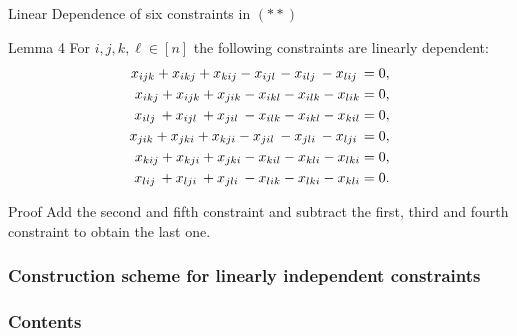 \documentclass[xcolor=dvipsnames]{beamer}
\numberwithin{bsp}{section}
\numberwithin{figure}{section}
\begin{document}
\begin{frame}{Linear Dependence of six constraints in $(**)$}
	\begin{block}{Lemma 4}
		For $i,j,k,\ell \in [n]$ the following constraints are linearly dependent:
		\vspace{-5 pt}
		\begin{align*}
		x_{ijk} + x_{ikj} + x_{kij} - x_{ijl}\hspace{1 pt} - x_{ilj}\hspace{2 pt} - x_{lij}\hspace{2 pt} &= 0, \\
		x_{ikj} + x_{ijk} + x_{jik} - x_{ikl} - x_{ilk} - x_{lik} &= 0, \\
		x_{ilj}\hspace{2 pt} + x_{ijl}\hspace{2 pt} + x_{jil}\hspace{2 pt} - x_{ilk} - x_{ikl} - x_{kil} &= 0, \\
		x_{jik} + x_{jki} + x_{kji} - x_{jil}\hspace{2 pt} - x_{jli}\hspace{2 pt} - x_{lji}\hspace{2 pt} &= 0, \\
		x_{kij} + x_{kji} + x_{jki} - x_{kil} - x_{kli} - x_{lki} &= 0, \\
		x_{lij}\hspace{2 pt} + x_{lji}\hspace{2 pt} + x_{jli}\hspace{2 pt} - x_{lik} - x_{lki} - x_{kli} &= 0.
		\end{align*}
	\end{block}
	
	\begin{block}{Proof}
		Add the second and fifth constraint and subtract the first, third and fourth constraint to obtain the last one.
	\end{block}
\end{frame}

\subsubsection{Construction scheme for linearly independent constraints}
\begin{frame}[plain]
	\frametitle{Contents}
	\linespread{1.1}
	\tableofcontents[currentsubsection]
\end{frame}
\end{document}
